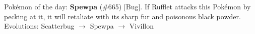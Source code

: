 Pokémon of the day:
\textbf{Spewpa} (\#665) [Bug].
If Rufflet attacks this Pok\'emon by pecking at it, it will retaliate with its sharp fur and poisonous black powder.
Evolutions: Scatterbug $\rightarrow$ Spewpa $\rightarrow$ Vivillon